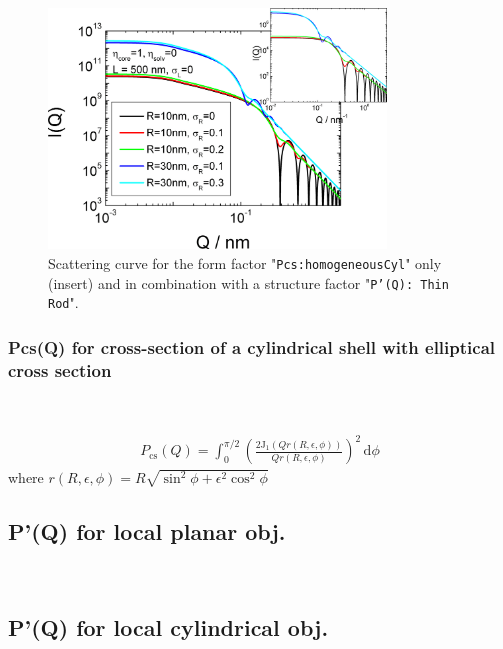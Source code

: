 \begin{figure}[htb]
\begin{center}
\includegraphics[width=0.8\textwidth,height=0.55\textwidth]{../images/form_factor/anisotropic/CylindricalHomogeneousXSIQ.png}
\end{center}
\caption{Scattering curve for the form factor "\texttt{Pcs:homogeneousCyl}" only (insert) and
in combination with a structure factor "\texttt{P'(Q): Thin Rod}".}
\label{fig_IQ:Pcs:CylindricalHomogeneousXSIQ}
\end{figure}

\clearpage
\subsubsection{Pcs(Q) for cross-section of a cylindrical shell with elliptical cross section} ~\\
\label{plugin:Pcs:CylEllSh}

\begin{align}
P_\textrm{cs}(Q) = \int_0^{\pi/2} \left( \frac{2 \mathrm{J}_1(Qr(R,\epsilon,\phi))}{Qr(R,\epsilon,\phi)} \right)^2 \, \mathrm{d}\phi
\end{align}
where $r(R,\epsilon,\phi)=R\sqrt{\sin^2\phi+\epsilon^2\cos^2\phi}$
\clearpage
\subsection{P'(Q) for local planar obj.} ~\\
\label{plugin:Pprime4planar}


\subsection{P'(Q) for local cylindrical obj.} ~\\
\label{plugin:Pprime4cylindrical}

